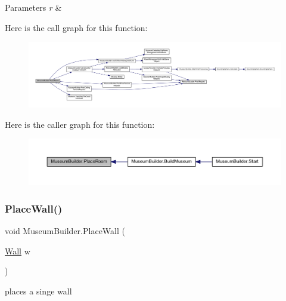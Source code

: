 \begin{DoxyParams}{Parameters}
{\em r} & \\
\hline
\end{DoxyParams}
Here is the call graph for this function\+:
\nopagebreak
\begin{figure}[H]
\begin{center}
\leavevmode
\includegraphics[width=350pt]{class_museum_builder_ad7891701beec2b305c8f0d40a7949933_cgraph}
\end{center}
\end{figure}
Here is the caller graph for this function\+:
\nopagebreak
\begin{figure}[H]
\begin{center}
\leavevmode
\includegraphics[width=350pt]{class_museum_builder_ad7891701beec2b305c8f0d40a7949933_icgraph}
\end{center}
\end{figure}
\mbox{\label{class_museum_builder_a5a8c364b8b6a51193a5c00d898668835}} 
\subsubsection{\texorpdfstring{Place\+Wall()}{PlaceWall()}}
{\footnotesize\ttfamily void Museum\+Builder.\+Place\+Wall (\begin{DoxyParamCaption}\item[{\mbox{\hyperlink{class_wall}{Wall}}}]{w }\end{DoxyParamCaption})\hspace{0.3cm}{\ttfamily [private]}}



places a singe wall 


